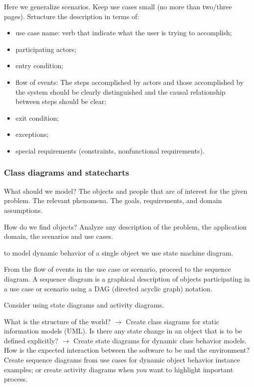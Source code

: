 Here we generalize scenarios. Keep use cases small (no more than two/three pages).
Srtucture the description in terms of:
\begin{itemize}
    \item use case name: verb that indicate what the user is trying     to accomplish;
    \item participating actors;
    \item entry condition;
    \item flow of events: The steps accomplished by actors and those accomplished by the system should be clearly distinguished and the causal relationship between steps should be clear;
    \item exit condition;
    \item exceptions;
    \item special requirements (constraints, nonfunctional requirements).
\end{itemize}

\subsubsection{Class diagrams and statecharts}
\label{subsubsect:diagrams}

What should we model? The objects and people that are of interest for the given problem. The relevant phenomena. The goals, requirements, and domain assumptions.

How do we find objects? Analyze any description of the problem, the application domain, the scenarios and use cases. 

to model dynamic behavior of a single object we use state machine diagram.

From the flow of events in the use case or scenario, proceed to the sequence diagram. A sequence diagram is a graphical description of objects participating in a use case or scenario using a DAG (directed acyclic graph) notation.

Consider using state diagrams and activity diagrams.

What is the structure of the world? $\rightarrow$ Create class siagrams for static information models (UML). Is there any state change in an object that is to be defined explicitly? $\rightarrow$ Create state diagrams for dynamic class behavior models. How is the expected interaction between the software to be and the environment? Create sequence diagrams from use cases for dynamic object behavior instance examples; or create activity diagrams when you want to highlight important process.

